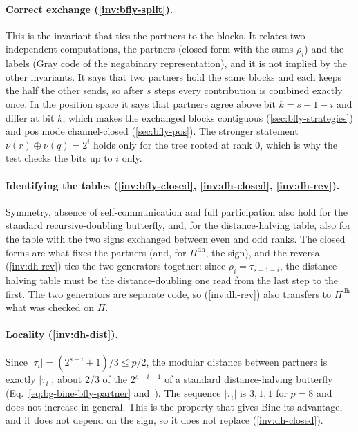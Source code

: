 \paragraph{Correct exchange (\ref{inv:bfly-split}).}
This is the invariant that ties the partners to the blocks.
It relates two independent computations, the partners (closed form with the sums $\rho_i$) and the labels (Gray code of the negabinary representation), and it is not implied by the other invariants.
It says that two partners hold the same blocks and each keeps the half the other sends, so after $s$ steps every contribution is combined exactly once.
In the position space it says that partners agree above bit $k=s-1-i$ and differ at bit $k$, which makes the exchanged blocks contiguous (\cref{sec:bfly-strategies}) and pos mode channel-closed (\cref{sec:bfly-pos}).
The stronger statement $\nu(r)\oplus\nu(q)=2^i$ holds only for the tree rooted at rank $0$, which is why the test checks the bits up to $i$ only.

\paragraph{Identifying the tables (\ref{inv:bfly-closed}, \ref{inv:dh-closed}, \ref{inv:dh-rev}).}
Symmetry, absence of self-communication and full participation also hold for the standard recursive-doubling butterfly, and, for the distance-halving table, also for the table with the two signs exchanged between even and odd ranks.
The closed forms are what fixes the partners (and, for $\Pi^{\mathrm{dh}}$, the sign), and the reversal (\ref{inv:dh-rev}) ties the two generators together: since $\rho_i=\tau_{s-1-i}$, the distance-halving table must be the distance-doubling one read from the last step to the first.
The two generators are separate code, so (\ref{inv:dh-rev}) also transfers to $\Pi^{\mathrm{dh}}$ what was checked on $\Pi$.

\paragraph{Locality (\ref{inv:dh-dist}).}
Since $\lvert\tau_i\rvert=(2^{s-i}\pm1)/3\le p/2$, the modular distance between partners is exactly $\lvert\tau_i\rvert$, about $2/3$ of the $2^{s-i-1}$ of a standard distance-halving butterfly (Eq.~\eqref{eq:bg-bine-bfly-partner} and~\cite{desensi2025bine}).
The sequence $\lvert\tau_i\rvert$ is $3,1,1$ for $p=8$ and does not increase in general.
This is the property that gives Bine its advantage, and it does not depend on the sign, so it does not replace (\ref{inv:dh-closed}).

